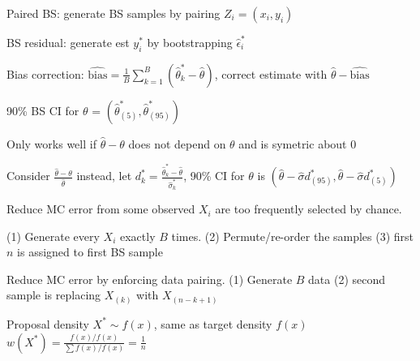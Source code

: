\documentclass{article}
\renewcommand{\subsection}[1]{\text{\hl{[#1]}}}
\begin{document}
\subsection{BS techniques}
Paired BS: generate BS samples by pairing $Z_i = (x_i, y_i)$

BS residual: generate est $y_i^*$ by bootstrapping $\hat\epsilon_i^*$

Bias correction: $\hat{\text{bias}} = \frac{1}{B}\sum_{k=1}^B (\hat\theta_k^* - \hat\theta)$, correct estimate with $\hat\theta - \hat{\text{bias}}$

\subsection{BS Percentile CI}
90\% BS CI for $\theta$ = $\left(\hat\theta^*_{(5)}, \hat\theta^*_{(95)}\right)$

Only works well if $\hat\theta - \theta$ does not depend on $\theta$ and is symetric about 0

\subsection{BS t CI}
Consider $\frac{\hat\theta - \theta}{\hat\theta}$ instead, let $d^*_k = \frac{\hat\theta_k^* - \hat\theta}{\hat\sigma^*_k}$,
90\% CI for $\theta$ is $(\hat\theta - \hat\sigma d^*_{(95)}, \hat\theta - \hat\sigma d^*_{(5)})$

\subsection{Balanced BS}
Reduce MC error from some observed $X_i$ are too frequently selected by chance.

(1) Generate every $X_i$ exactly $B$ times. (2) Permute/re-order the samples (3) first $n$ is assigned to first BS sample

\subsection{Antithetic BS}
Reduce MC error by enforcing data pairing.
(1) Generate $B$ data (2) second sample is replacing $X_{(k)}$ with $X_{(n-k+1)}$

\subsection{BS as SIS}
Proposal density $X^*\sim f(x)$, same as target density $f(x)$
$w(X^*) = \frac{f(x)/f(x)}{\sum f(x)/f(x)} = \frac{1}{n}$
\end{document}
